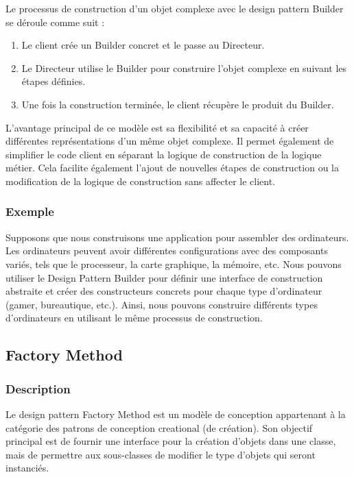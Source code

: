Le processus de construction d'un objet complexe avec le design pattern Builder se déroule comme suit :

\begin{enumerate}[leftmargin=*,labelsep=3mm]
    \item Le client crée un Builder concret et le passe au Directeur.
    \item Le Directeur utilise le Builder pour construire l'objet complexe en suivant les étapes définies.
    \item Une fois la construction terminée, le client récupère le produit du Builder.
\end{enumerate}

L'avantage principal de ce modèle est sa flexibilité et sa capacité à créer différentes représentations d'un même objet complexe. Il permet également de simplifier le code client en séparant la logique de construction de la logique métier. Cela facilite également l'ajout de nouvelles étapes de construction ou la modification de la logique de construction sans affecter le client.


\subsubsection{Exemple}

Supposons que nous construisons une application pour assembler des ordinateurs. Les ordinateurs peuvent avoir différentes configurations avec des composants variés, tels que le processeur, la carte graphique, la mémoire, etc. Nous pouvons utiliser le Design Pattern Builder pour définir une interface de construction abstraite et créer des constructeurs concrets pour chaque type d'ordinateur (gamer, bureautique, etc.). Ainsi, nous pouvons construire différents types d'ordinateurs en utilisant le même processus de construction.




\newpage

\subsection{Factory Method}

\subsubsection{Description}

Le design pattern Factory Method est un modèle de conception appartenant à la catégorie des patrons de conception creational (de création). Son objectif principal est de fournir une interface pour la création d'objets dans une classe, mais de permettre aux sous-classes de modifier le type d'objets qui seront instanciés.

